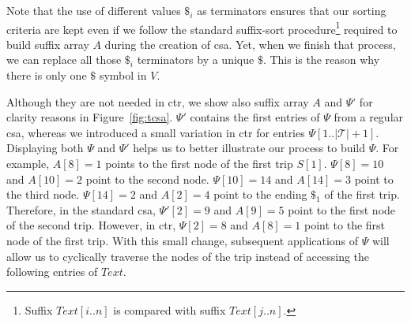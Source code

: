 	Note that the use of different values $\$_i$ as terminators ensures that our sorting criteria are kept even if we follow the
	standard suffix-sort procedure\footnote{Suffix $Text[i..n]$ is compared with suffix $Text[j..n]$.} 
	required to build suffix array $A$ during the creation of \gls{csa}. Yet, when we finish that
	process, we can replace all those $\$_i$ terminators by a unique $\$$. This is the reason why there is only one $\$$ symbol in $V$. 
	 

	Although they are not needed in \gls{ctr}, we show also suffix array $A$ and $\Psi$' for clarity reasons in Figure~\ref{fig:tcsa}. 
	$\Psi'$  contains the first entries of $\Psi$ from a regular \gls{csa}, whereas we introduced a small variation
	in \gls{ctr} for entries $\Psi[1..|\mathcal{T}|+1]$. Displaying both $\Psi$ and $\Psi'$ helps us to better illustrate our process to build $\Psi$. 
	For example, $A[8]=1$ points to the first node of the first trip $S[1]$.
	$\Psi[8]=10$ and $A[10]=2$ point to the second node.  $\Psi[10]=14$ and $A[14]=3$ point to the third node.
	$\Psi[14]=2$ and $A[2]=4$ point to the ending $\$_1$ of the first trip. Therefore, in the standard 
	\gls{csa}, $\Psi'[2]=9$ and $A[9]=5$  point to the first node of the second trip. 
	However, in  \gls{ctr}, $\Psi[2]=8$ and $A[8]=1$ point
	to the first node of the first trip. With this small change, subsequent applications of $\Psi$ will allow 
	us to cyclically traverse the nodes of the trip instead of accessing the following entries of $Text$.

